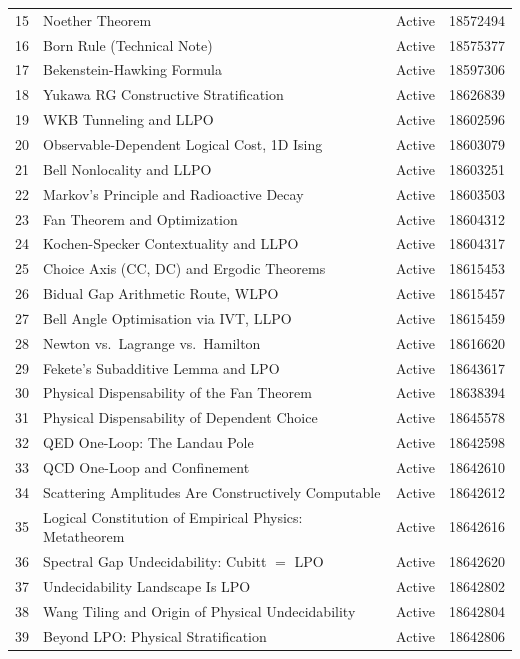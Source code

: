 \documentclass[11pt,twoside,openany]{report}
\theoremstyle{remark}
\begin{document}
\begin{longtable}{@{}r p{7.5cm} l l@{}}
 15 & Noether Theorem & Active & 18572494 \\
 16 & Born Rule (Technical Note) & Active & 18575377 \\
 17 & Bekenstein-Hawking Formula & Active & 18597306 \\
 18 & Yukawa RG Constructive Stratification & Active & 18626839 \\
 19 & WKB Tunneling and LLPO & Active & 18602596 \\
 20 & Observable-Dependent Logical Cost, 1D Ising & Active & 18603079 \\
 21 & Bell Nonlocality and LLPO & Active & 18603251 \\
 22 & Markov's Principle and Radioactive Decay & Active & 18603503 \\
 23 & Fan Theorem and Optimization & Active & 18604312 \\
 24 & Kochen-Specker Contextuality and LLPO & Active & 18604317 \\
 25 & Choice Axis (CC, DC) and Ergodic Theorems & Active & 18615453 \\
 26 & Bidual Gap Arithmetic Route, WLPO & Active & 18615457 \\
 27 & Bell Angle Optimisation via IVT, LLPO & Active & 18615459 \\
 28 & Newton vs.\ Lagrange vs.\ Hamilton & Active & 18616620 \\
 29 & Fekete's Subadditive Lemma and LPO & Active & 18643617 \\
 30 & Physical Dispensability of the Fan Theorem & Active & 18638394 \\
 31 & Physical Dispensability of Dependent Choice & Active & 18645578 \\
 32 & QED One-Loop: The Landau Pole & Active & 18642598 \\
 33 & QCD One-Loop and Confinement & Active & 18642610 \\
 34 & Scattering Amplitudes Are Constructively Computable & Active & 18642612 \\
 35 & Logical Constitution of Empirical Physics: Metatheorem & Active & 18642616 \\
 36 & Spectral Gap Undecidability: Cubitt $=$ LPO & Active & 18642620 \\
 37 & Undecidability Landscape Is LPO & Active & 18642802 \\
 38 & Wang Tiling and Origin of Physical Undecidability & Active & 18642804 \\
 39 & Beyond LPO: Physical Stratification & Active & 18642806 \\

\end{longtable}
\end{document}
